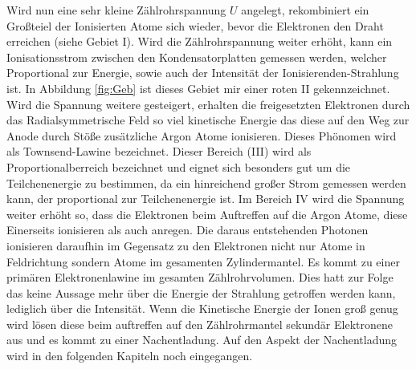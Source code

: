 Wird nun eine sehr kleine Zählrohrspannung $U$ angelegt, rekombiniert ein Großteiel der Ionisierten Atome sich wieder, bevor die Elektronen den Draht erreichen (siehe Gebiet I). Wird die Zählrohrspannung weiter erhöht, kann ein Ionisationsstrom zwischen den Kondensatorplatten gemessen werden, welcher Proportional zur Energie, sowie auch der Intensität der Ionisierenden-Strahlung ist. In Abbildung \ref{fig:Geb} ist dieses Gebiet mir einer roten II gekennzeichnet. Wird die Spannung weitere gesteigert, erhalten die freigesetzten Elektronen durch das Radialsymmetrische Feld so viel kinetische Energie das diese auf den Weg zur Anode durch Stöße zusätzliche Argon Atome ionisieren. Dieses Phönomen wird als Townsend-Lawine bezeichnet. Dieser Bereich (III) wird als Proportionalberreich bezeichnet und eignet sich besonders gut um die Teilchenenergie zu bestimmen, da ein hinreichend großer Strom gemessen werden kann, der proportional zur Teilchenenergie ist. Im Bereich IV wird die Spannung weiter erhöht so, dass die Elektronen beim Auftreffen auf die Argon Atome, diese Einerseits ionisieren als auch anregen. Die daraus entstehenden Photonen ionisieren daraufhin im Gegensatz zu den Elektronen nicht nur Atome in Feldrichtung sondern Atome im gesamenten Zylindermantel. Es kommt zu einer primären Elektronenlawine im gesamten Zählrohrvolumen. Dies hatt zur Folge das keine Aussage mehr über die Energie der Strahlung getroffen werden kann, lediglich über die Intensität. Wenn die Kinetische Energie der Ionen groß genug wird lösen diese beim auftreffen auf den Zählrohrmantel sekundär Elektronene aus und es kommt zu einer Nachentladung. Auf den Aspekt der Nachentladung wird in den folgenden Kapiteln noch eingegangen.


